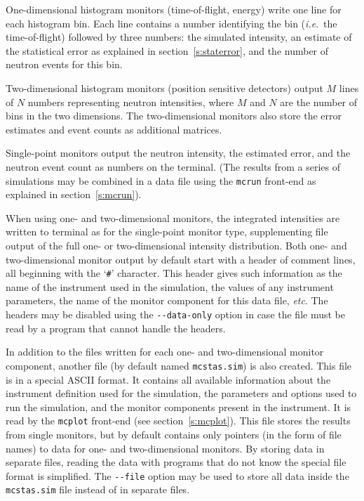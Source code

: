 One-dimensional histogram monitors (time-of-flight, energy)
write one line for each histogram bin. Each line contains a number
identifying the bin (\textit{i.e}.\ the time-of-flight) followed by
three numbers: the simulated intensity, an estimate of the statistical
error as explained in section~\ref{s:staterror}, and the number of
neutron events for this bin.

Two-dimensional histogram monitors (position sensitive detectors) output $M$
lines of $N$ numbers representing neutron intensities, where $M$ and $N$ are the
number of bins in the two dimensions. The two-dimensional monitors also store
the error estimates and event counts as additional matrices.

Single-point monitors output the neutron intensity, the estimated
error, and the neutron event count as numbers on the
terminal. (The results from a series of simulations may be combined in a
data file using the \verb+mcrun+ front-end as explained in
section~\ref{s:mcrun}).

When using one- and two-dimensional monitors, the integrated intensities are
written to terminal as for the single-point monitor type, supplementing file
output of the full one- or two-dimensional intensity distribution. Both one- and
two-dimensional monitor output by default start with a header of comment lines,
all beginning with the `\verb+#+' character.  This header gives such information
as the name of the instrument used in the simulation, the values of any
instrument parameters, the name of the monitor component for this data file,
\textit{etc}. The headers may be disabled using the \verb+--data-only+ option in
case the file must be read by a program that cannot handle the headers.

In addition to the files written for each one- and two-dimensional monitor
component, another file (by default named \verb+mcstas.sim+) is also
created. This file is in a special \MCS ASCII format. It contains all available
information about the instrument definition used for the simulation, the
parameters and options used to run the simulation, and the monitor components
present in the instrument. It is read by the \verb+mcplot+ front-end (see
section~\ref{s:mcplot}). This file stores the results from single monitors, but
by default contains only pointers (in the form of file names) to data for one-
and two-dimensional monitors. By storing data in separate files, reading the
data with programs that do not know the special \MCS file format is
simplified. The \verb+--file+ option may be used to store all data inside the
\verb+mcstas.sim+ file instead of in separate files.

